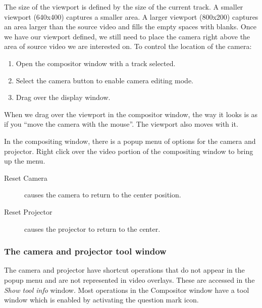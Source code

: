 The size of the viewport is defined by the size of the current track. 
A smaller viewport (640x400) captures a smaller area. 
A larger viewport (800x200) captures an area larger than the source video and fills the empty spaces with blanks. 
Once we have our viewport defined, we still need to place the camera right above the area of source video we are interested on. To control the location of the camera:

\begin{enumerate}
    \item  Open the compositor window with a track selected.
    \item  Select the camera button to enable camera editing mode.
    \item  Drag over the display window.
\end{enumerate}

When we drag over the viewport in the compositor window, the way it looks is as if you “move the camera with the mouse”.  The viewport also moves with it.

In the compositing window, there is a popup menu of options for the camera and projector. Right click over the video portion of the compositing window to bring up the menu.

\begin{description}
    \item[Reset Camera] causes the camera to return to the center position.	
	\item[Reset Projector] causes the projector to return to the center.
\end{description}

\subsubsection*{The camera and projector tool window}%
\label{ssub:the_camera_and_projector_tool_window}

The camera and projector have shortcut operations that do not appear in the popup menu and are not represented in video overlays. 
These are accessed in the \emph{Show tool info} window. 
Most operations in the Compositor window have a tool window which is enabled by activating the question mark icon.

